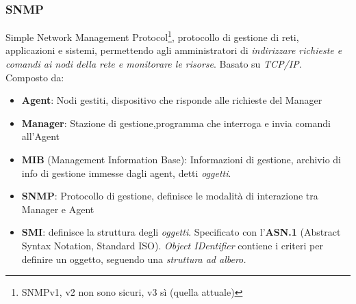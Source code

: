 \documentclass[a4paper,11pt]{article}
\begin{document}
\subsubsection{SNMP}
Simple Network Management Protocol\footnote{SNMPv1, v2 non sono sicuri, v3 sì (quella attuale)}, protocollo di gestione di reti, applicazioni e sistemi, permettendo agli amministratori di \textit{indirizzare richieste e comandi ai nodi della rete e monitorare le risorse}. Basato su \textit{TCP/IP}.\\
Composto da:
\begin{itemize}
\item\textbf{Agent}: Nodi gestiti, dispositivo che risponde alle richieste del Manager
\item\textbf{Manager}: Stazione di gestione,programma che interroga e invia comandi all'Agent
\item\textbf{MIB} (Management Information Base): Informazioni di gestione, archivio di info di gestione immesse dagli agent, detti \textit{oggetti}.
\item\textbf{SNMP}: Protocollo di gestione, definisce le modalità di interazione tra Manager e Agent
\item\textbf{SMI}: definisce la struttura degli \textit{oggetti}. Specificato con l'\textbf{ASN.1} (Abstract Syntax Notation, Standard ISO). \textit{Object IDentifier} contiene i criteri per definire un oggetto, seguendo una \textit{struttura ad albero.}
\end{itemize}
\newpage
\end{document}
